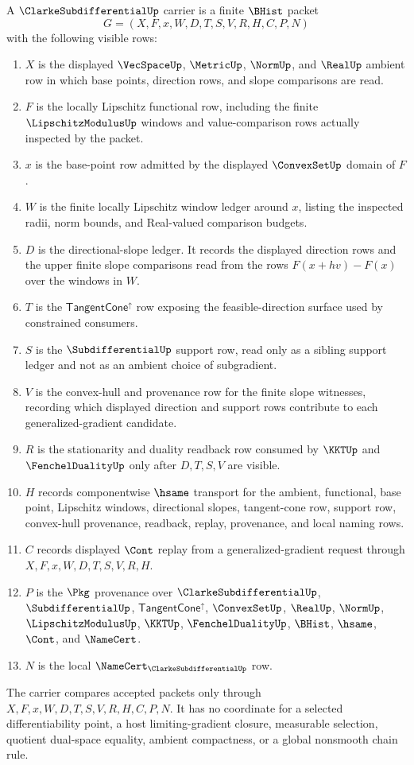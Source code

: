 \begin{definition}
\label{def:clarke-subdifferential-carrier}
A $\ClarkeSubdifferentialUp$ carrier is a finite $\BHist$ packet
$$
G=(X,F,x,W,D,T,S,V,R,H,C,P,N)
$$
with the following visible rows:
\begin{enumerate}
\item $X$ is the displayed $\VecSpaceUp$, $\MetricUp$, $\NormUp$, and $\RealUp$ ambient row in which base points, direction rows, and slope comparisons are read.
\item $F$ is the locally Lipschitz functional row, including the finite $\LipschitzModulusUp$ windows and value-comparison rows actually inspected by the packet.
\item $x$ is the base-point row admitted by the displayed $\ConvexSetUp$ domain of $F$.
\item $W$ is the finite locally Lipschitz window ledger around $x$, listing the inspected radii, norm bounds, and Real-valued comparison budgets.
\item $D$ is the directional-slope ledger. It records the displayed direction rows and the upper finite slope comparisons read from the rows $F(x+h v)-F(x)$ over the windows in $W$.
\item $T$ is the $\mathsf{TangentCone}^{\uparrow}$ row exposing the feasible-direction surface used by constrained consumers.
\item $S$ is the $\SubdifferentialUp$ support row, read only as a sibling support ledger and not as an ambient choice of subgradient.
\item $V$ is the convex-hull and provenance row for the finite slope witnesses, recording which displayed direction and support rows contribute to each generalized-gradient candidate.
\item $R$ is the stationarity and duality readback row consumed by $\KKTUp$ and $\FenchelDualityUp$ only after $D,T,S,V$ are visible.
\item $H$ records componentwise $\hsame$ transport for the ambient, functional, base point, Lipschitz windows, directional slopes, tangent-cone row, support row, convex-hull provenance, readback, replay, provenance, and local naming rows.
\item $C$ records displayed $\Cont$ replay from a generalized-gradient request through $X,F,x,W,D,T,S,V,R,H$.
\item $P$ is the $\Pkg$ provenance over $\ClarkeSubdifferentialUp$, $\SubdifferentialUp$, $\mathsf{TangentCone}^{\uparrow}$, $\ConvexSetUp$, $\RealUp$, $\NormUp$, $\LipschitzModulusUp$, $\KKTUp$, $\FenchelDualityUp$, $\BHist$, $\hsame$, $\Cont$, and $\NameCert$.
\item $N$ is the local $\NameCert_{\ClarkeSubdifferentialUp}$ row.
\end{enumerate}
The carrier compares accepted packets only through $X,F,x,W,D,T,S,V,R,H,C,P,N$. It has no coordinate for a selected differentiability point, a host limiting-gradient closure, measurable selection, quotient dual-space equality, ambient compactness, or a global nonsmooth chain rule.
\end{definition}

